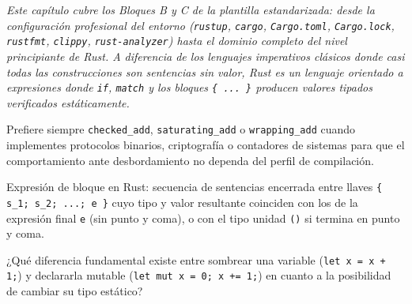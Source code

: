 \documentclass{book}
\begin{document}
\noindent\textit{Este capítulo cubre los Bloques B y C de la plantilla estandarizada: desde la configuración profesional del entorno (\texttt{rustup}, \texttt{cargo}, \texttt{Cargo.toml}, \texttt{Cargo.lock}, \texttt{rustfmt}, \texttt{clippy}, \texttt{rust-analyzer}) hasta el dominio completo del nivel principiante de Rust. A diferencia de los lenguajes imperativos clásicos donde casi todas las construcciones son sentencias sin valor, Rust es un lenguaje orientado a expresiones donde \texttt{if}, \texttt{match} y los bloques \texttt{\{ ... \}} producen valores tipados verificados estáticamente.}

\begin{tcolorbox}[title={Consejo}, studiumtip, breakable]

Prefiere siempre \texttt{checked\_add}, \texttt{saturating\_add} o \texttt{wrapping\_add} cuando implementes protocolos binarios, criptografía o contadores de sistemas para que el comportamiento ante desbordamiento no dependa del perfil de compilación.
\end{tcolorbox}

\begin{tcolorbox}[title={Definición}, studiumdef, breakable]

Expresión de bloque en Rust: secuencia de sentencias encerrada entre llaves \texttt{\{ s\_1; s\_2; ...; e \}} cuyo tipo y valor resultante coinciden con los de la expresión final \texttt{e} (sin punto y coma), o con el tipo unidad \texttt{()} si termina en punto y coma.
\end{tcolorbox}

\begin{tcolorbox}[title={Autoficha}, studiumcheck, breakable]

¿Qué diferencia fundamental existe entre sombrear una variable (\texttt{let x = x + 1;}) y declararla mutable (\texttt{let mut x = 0; x += 1;}) en cuanto a la posibilidad de cambiar su tipo estático?
\end{tcolorbox}
\end{document}
